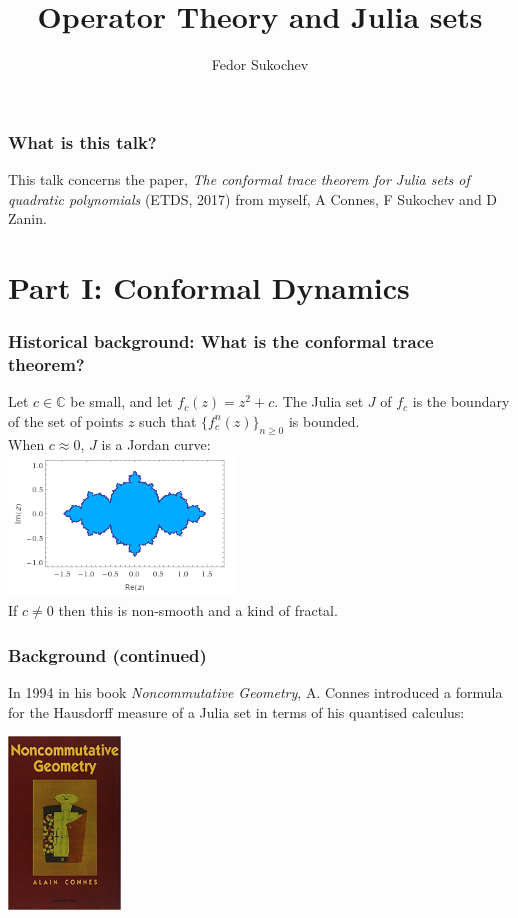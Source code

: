 \documentclass{beamer} %
\title{Operator Theory and Julia sets}
\author{Fedor Sukochev}
\institute{UNSW}
\theoremstyle{definition} %
\newcommand{\Cplx}{\mathbb{C}}
\def\qd{\,{\mathchar'26\mkern-12mu d}}
\begin{document}
\begin{frame} 
\titlepage
\end{frame}

\begin{frame}\frametitle{What is this talk?}
    This talk concerns the paper, 
    \emph{ The conformal trace theorem for Julia sets of quadratic polynomials}
    (ETDS, 2017) from myself, A Connes, F Sukochev and D Zanin.
\end{frame}



\section{Part I: Conformal Dynamics}

\begin{frame}\frametitle{Historical background: What is the conformal trace theorem?}
    Let $c \in \Cplx$ be small, and let $f_c(z) = z^2+c$. The Julia set $J$ of $f_c$ is the boundary of the set of points $z$ such that $\{f_c^n(z)\}_{n\geq 0}$ is bounded.\\
    When $c \approx 0$, $J$ is a Jordan curve:\\
    \includegraphics[width=60mm]{img/julia-07001-filled.png}\\
    If $c \neq 0$ then this is non-smooth and a kind of fractal.
\end{frame}

\begin{frame}\frametitle{Background (continued)}
    In 1994 in his book {\it Noncommutative Geometry}, A. Connes introduced a formula for the Hausdorff measure of a Julia set in terms of his quantised calculus:
    \begin{center}
    \includegraphics[width=30mm]{img/ncg-book-cover.jpg}
    \end{center}
\end{frame}
\end{document}
